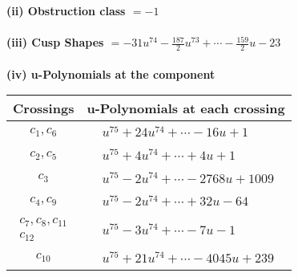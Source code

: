 \documentclass[1p]{elsarticle_modified}
\theoremstyle{definition}
\begin{document}
\flushleft \textbf{(ii) Obstruction class $= -1$}\\~\\
\flushleft \textbf{(iii) Cusp Shapes $= -31 u^{74}-\frac{187}{2} u^{73}+\cdots-\frac{159}{2} u-23$}\\~\\
\newpage\renewcommand{\arraystretch}{1}
\flushleft \textbf{(iv) u-Polynomials at the component}\newline \\
\begin{tabular}{m{50pt}|m{274pt}}
Crossings & \hspace{64pt}u-Polynomials at each crossing \\
\hline $$\begin{aligned}c_{1},c_{6}\end{aligned}$$&$\begin{aligned}
&u^{75}+24 u^{74}+\cdots-16 u+1
\end{aligned}$\\
\hline $$\begin{aligned}c_{2},c_{5}\end{aligned}$$&$\begin{aligned}
&u^{75}+4 u^{74}+\cdots+4 u+1
\end{aligned}$\\
\hline $$\begin{aligned}c_{3}\end{aligned}$$&$\begin{aligned}
&u^{75}-2 u^{74}+\cdots-2768 u+1009
\end{aligned}$\\
\hline $$\begin{aligned}c_{4},c_{9}\end{aligned}$$&$\begin{aligned}
&u^{75}-2 u^{74}+\cdots+32 u-64
\end{aligned}$\\
\hline $$\begin{aligned}c_{7},c_{8},c_{11}\\c_{12}\end{aligned}$$&$\begin{aligned}
&u^{75}-3 u^{74}+\cdots-7 u-1
\end{aligned}$\\
\hline $$\begin{aligned}c_{10}\end{aligned}$$&$\begin{aligned}
&u^{75}+21 u^{74}+\cdots-4045 u+239
\end{aligned}$\\
\hline
\end{tabular}\\~\\
\end{document}
